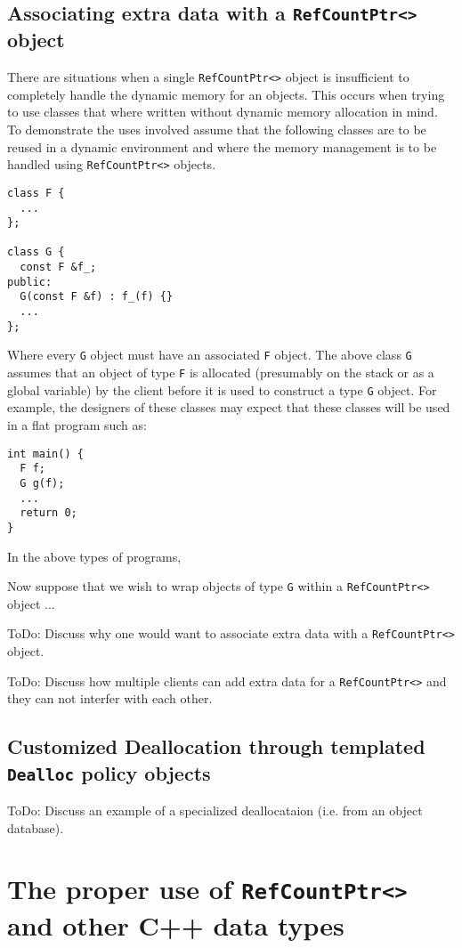%
\subsection{Associating extra data with a \texttt{RefCountPtr<>} object}
%

There are situations when a single \texttt{RefCountPtr<>} object is
insufficient to completely handle the dynamic memory for an objects.
This occurs when trying to use classes that where written without
dynamic memory allocation in mind.  To demonstrate the uses involved
assume that the following classes are to be reused in a dynamic
environment and where the memory management is to be handled using
\texttt{RefCountPtr<>} objects.
%
{\scriptsize\begin{verbatim}
class F {
  ...
};

class G {
  const F &f_;
public:
  G(const F &f) : f_(f) {}
  ...
};
\end{verbatim}}
%
\noindent{}Where every \texttt{G} object must have an associated
\texttt{F} object.  The above class \texttt{G} assumes that an object
of type \texttt{F} is allocated (presumably on the stack or as a
global variable) by the client before it is used to construct a type
\texttt{G} object.  For example, the designers of these classes may
expect that these classes will be used in a flat program such as:
%
{\scriptsize\begin{verbatim}
int main() {
  F f;
  G g(f);
  ...
  return 0;
}
\end{verbatim}}
%
\noindent{}In the above types of programs, 

Now suppose that we wish to wrap objects of type \texttt{G}
within a \texttt{RefCountPtr<>} object ...

ToDo: Discuss why one would want to associate extra data with a \texttt{RefCountPtr<>}
object.

ToDo: Discuss how multiple clients can add extra data for a \texttt{RefCountPtr<>}
and they can not interfer with each other.

%
\subsection{Customized Deallocation through templated \texttt{Dealloc} policy objects}
%

ToDo: Discuss an example of a specialized deallocataion (i.e. from an
object database).

%
\section{The proper use of \texttt{RefCountPtr<>} and other C++ data types}
%

